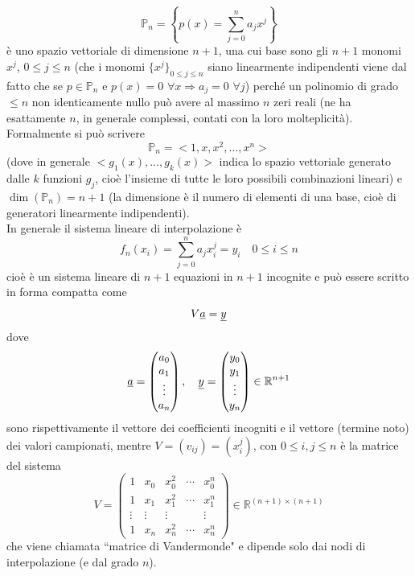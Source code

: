 \[ \mathbb{P}_n = \left\{p(x) = \sum_{j=0}^n a_j x^j \right\} \]
è uno spazio vettoriale di dimensione $n+1$, una cui base sono gli $n+1$ monomi $x^j$, $0 \leq j \leq n$ (che i monomi $\{ x^j \}_{0 \leq j \leq n}$ siano linearmente indipendenti viene dal fatto che se $p \in \mathbb{P}_n$ e $p(x) = 0$ $\forall x \Rightarrow a_j = 0$ $\forall j$) perché un polinomio di grado $\leq n$ non identicamente nullo può avere al massimo $n$ zeri reali (ne ha esattamente $n$, in generale complessi, contati con la loro molteplicità).\\
Formalmente si può scrivere
\[ \mathbb{P}_n = < 1, x, x^2, \dotso, x^n > \]
(dove in generale $< g_1(x), \dotso, g_k(x) >$ indica lo spazio vettoriale generato dalle $k$ funzioni $g_j$, cioè l'insieme di tutte le loro possibili combinazioni lineari) e $\dim(\mathbb{P}_n) = n+1$ (la dimensione è il numero di elementi di una base, cioè di generatori linearmente indipendenti).\\
In generale il sistema lineare di interpolazione è
\[ f_n(x_i) = \sum_{j=0}^n a_j x_i^j = y_i \quad 0 \le i \le n \]
cioè è un sistema lineare di $n+1$ equazioni in $n+1$ incognite e può essere scritto in forma compatta come
\[ V\uline{a} = \uline{y} \]
dove
\[ \uline{a} = 
    \begin{pmatrix}
    a_0 \\ a_1 \\ \vdots \\ a_n
    \end{pmatrix}, \quad
\uline{y} =
    \begin{pmatrix}
    y_0 \\ y_1 \\ \vdots \\ y_n
    \end{pmatrix}
    \in \mathbb{R}^{n+1} \]
sono rispettivamente il vettore dei coefficienti incogniti e il vettore (termine noto) dei valori campionati, mentre $V = (v_{ij}) = (x_i^j)$, con $0 \leq i,j \leq n$ è la matrice del sistema
\[ V =
    \begin{pmatrix}
    1 & x_0 & x_0^2 & \cdots & x_0^n \\
    1 & x_1 & x_1^2 & \cdots & x_1^n \\
    \vdots & \vdots & \vdots & \ & \vdots \\
    1 & x_n & x_n^2 & \cdots & x_n^n
    \end{pmatrix}
    \in \mathbb{R}^{(n+1) \times (n+1)} \]
che viene chiamata ``matrice di Vandermonde" e dipende solo dai nodi di interpolazione (e dal grado $n$).\\

